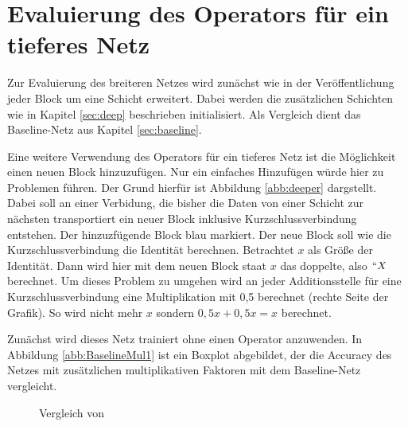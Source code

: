 \section{Evaluierung des Operators für ein tieferes Netz}
Zur Evaluierung des breiteren Netzes wird zunächst wie in der Veröffentlichung jeder Block um eine Schicht erweitert. Dabei werden die zusätzlichen Schichten wie in Kapitel \ref{sec:deep} beschrieben initialisiert. Als Vergleich dient das Baseline-Netz aus Kapitel \ref{sec:baseline}.


Eine weitere Verwendung des Operators für ein tieferes Netz ist die Möglichkeit einen neuen Block hinzuzufügen. Nur ein einfaches Hinzufügen würde hier zu Problemen führen. Der Grund hierfür ist Abbildung \ref{abb:deeper} dargstellt. Dabei soll an einer Verbidung, die bisher die Daten von einer Schicht zur nächsten transportiert ein neuer Block inklusive Kurzschlussverbindung entstehen. Der hinzuzfügende Block blau  markiert. Der neue Block soll wie die Kurzschlussverbindung die Identität berechnen. Betrachtet $x$ als Größe der Identität. Dann wird hier mit dem neuen Block staat $x$ das doppelte, also $``X$ berechnet. Um dieses Problem zu umgehen wird an jeder Additionsstelle für eine Kurzschlussverbindung eine Multiplikation mit 0,5 berechnet (rechte Seite der Grafik). So wird nicht mehr $x$ sondern $0,5x +0,5x=x$ berechnet.

Zunächst wird dieses Netz trainiert ohne einen Operator anzuwenden. In Abbildung \ref{abb:BaselineMul1} ist ein Boxplot abgebildet, der die Accuracy des Netzes mit zusätzlichen multiplikativen Faktoren mit dem Baseline-Netz vergleicht.

 \begin{figure}
     \centering
     \hfill
     \caption{Vergleich von }
     \label{abb:BaselineMul}
\end{figure}


